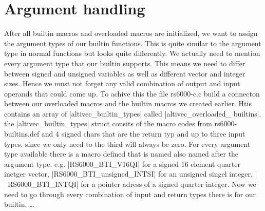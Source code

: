 \chapter{Argument handling}
\label{chapter:argument handling}

After all builtin macros and overloaded macros are initialized, we want to assign the argument types of our builtin functions. This is quite similar to the argument type in normal functions but looks quite differently. We actually need to mention every argument type that our builtin supports. This means we need to differ between signed and unsigned variables as well as different vector and integer sizes.
Hence we must not forget any valid combination of output and input operands that could come up.
To achive this the file rs6000-c.c build a connecton between our overloaded macros and the builtin macros we created earlier. Htis contains an array of |altivec_builtin_types| called |altivec_overloaded_ builtins|. the |altivec_builtin_types| struct consits of the macro codes from rs6000-builtins.def and 4 signed chars that are the return typ and up to three input types. since we only need to the third will always be zero. 
For every argument type available there is a macro defined that is named also named after the argument type. e.g. |RS6000_BTI_V16QI| for a signed 16 element quarter inetger vector, |RS6000_BTI_unsigned_INTSI| for an unsigned singel integer, |~RS6000_BTI_INTQI| for a pointer adress of a signed quarter integer.
Now we need to go through every combination of input and return types there is for our builtin.
…
